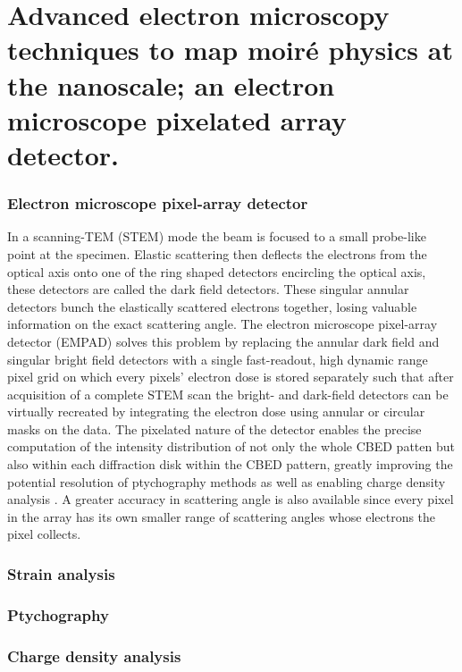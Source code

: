 \section{Advanced electron microscopy techniques to map moiré physics at the nanoscale; an electron microscope pixelated array detector.}

\subsubsection{Electron microscope pixel-array detector}
In a scanning-TEM (STEM) mode the beam is focused to a small probe-like point at the specimen. Elastic scattering then deflects the electrons from the optical axis onto one of the ring shaped detectors encircling the optical axis, these detectors are called the dark field detectors. These singular annular detectors bunch the elastically scattered electrons together, losing valuable information on the exact scattering angle. The electron microscope pixel-array detector (EMPAD) solves this problem by replacing the annular dark field and singular bright field detectors with a single fast-readout, high dynamic range pixel grid on which every pixels' electron dose is stored separately such that after acquisition of a complete STEM scan the bright- and dark-field detectors can be virtually recreated by integrating the electron dose using annular or circular masks on the data.
The pixelated nature of the detector enables the precise computation of the intensity distribution of not only the whole CBED patten but also within each diffraction disk within the CBED pattern, greatly improving the potential resolution of ptychography methods \cite{pennycookEfficientPhaseContrast2015, yangEfficientPhaseContrast2015a} as well as enabling charge density analysis \cite{hachtelSubAngstromElectricField2018,wenMapping1DConfined2022,fangAtomicElectrostaticMaps2019}.
A greater accuracy in scattering angle is also available since every pixel in the array has its own smaller range of scattering angles whose electrons the pixel collects.



\subsubsection{Strain analysis}

\subsubsection{Ptychography}

\subsubsection{Charge density analysis}





